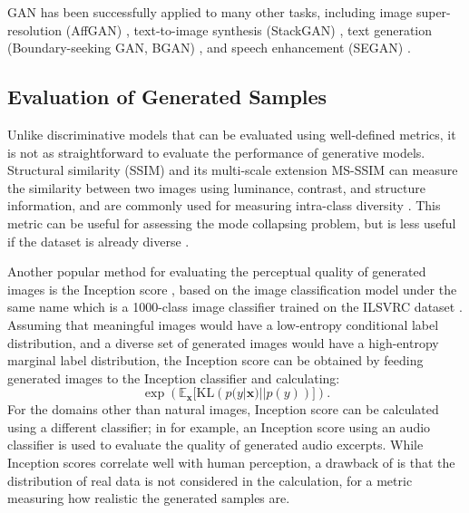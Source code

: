 GAN has been successfully applied to many other tasks, including image super-resolution (AffGAN) \cite{sonderby2016amortised}, text-to-image synthesis (StackGAN) \cite{zhang2017stackgan,zhang2017stackgan2}, text generation (Boundary-seeking GAN, BGAN) \cite{hjelm2018bsgan}, and speech enhancement (SEGAN) \cite{pascual2017segan}.


\subsection{Evaluation of Generated Samples}

Unlike discriminative models that can be evaluated using well-defined metrics, it is not as straightforward to evaluate the performance of generative models.
Structural similarity (SSIM) \cite{wang2004ssim} and its multi-scale extension MS-SSIM \cite{wang2003msssim} can measure the similarity between two images using luminance, contrast, and structure information, and are commonly used for measuring intra-class diversity \cite{odena2016acgan}.
This metric can be useful for assessing the mode collapsing problem, but is less useful if the dataset is already diverse \cite{fedus2018equilibrium}.

Another popular method for evaluating the perceptual quality of generated images is the Inception score \cite{salimans2016improved}, based on the image classification model under the same name \cite{szegedy2015inception} which is a 1000-class image classifier trained on the ILSVRC dataset \cite{russakovsky2015imagenet}.
Assuming that meaningful images would have a low-entropy conditional label distribution, and a diverse set of generated images would have a high-entropy marginal label distribution, the Inception score can be obtained by feeding generated images to the Inception classifier and calculating:
\begin{equation}\label{eqn:inception}
\exp \left ( \mathbb{E}_{\bm{x}} \Big[ \textrm{KL} \left ( p(y|\bm{x}) || p(y) \right ) \Big] \right ).
\end{equation}
For the domains other than natural images, Inception score can be calculated using a different classifier; in \cite{donahue2018wavegan} for example, an Inception score using an audio classifier is used to evaluate the quality of generated audio excerpts.
While Inception scores correlate well with human perception, a drawback of is that the distribution of real data is not considered in the calculation, for a metric measuring how realistic the generated samples are.

